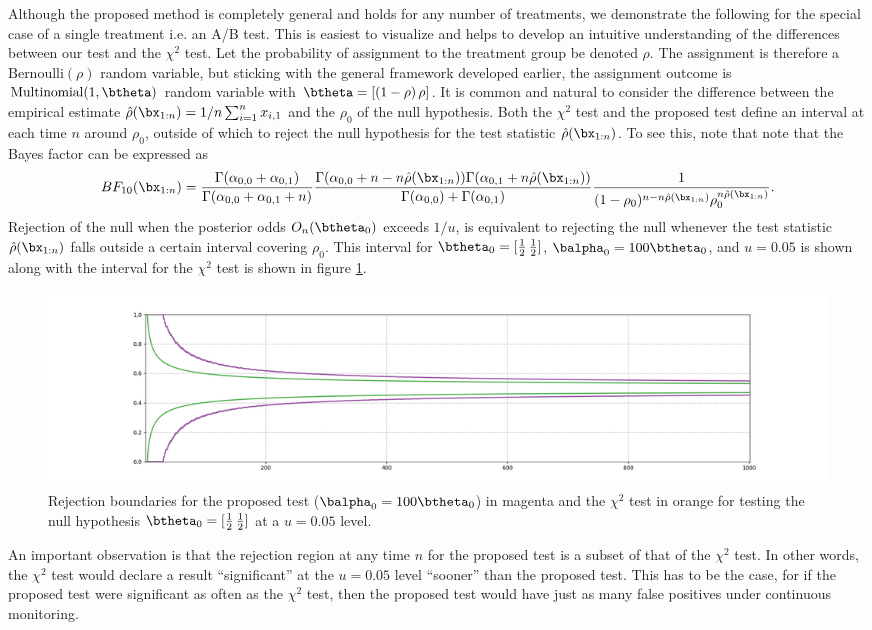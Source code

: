 \documentclass[11pt]{article}
\begin{document}
  Although the proposed method is completely general and holds for any number of treatments, we demonstrate the following for the special case of a single treatment i.e. an A/B test.
  This is easiest to visualize and helps to develop an intuitive understanding of the differences between our test and the $\chi^2$ test.
  Let the probability of assignment to the treatment group be denoted $\rho$.
The assignment is therefore a $\text{Bernoulli}(\rho)$ random variable, but sticking with the general framework developed earlier, the assignment outcome is $\text{Multinomial}(1,\btheta)$ random variable with $\btheta = [(1-\rho)\, \rho]$.
It is common and natural to consider the difference between the empirical estimate $\hat{\rho}(\bx_{1:n}) = 1/n \sum_{i=1}^{n} x_{i,1}$ and the $\rho_0$ of the null hypothesis.
Both the $\chi^2$ test and the proposed test define an interval at each time $n$ around $\rho_0$, outside of which to reject the null hypothesis for the test statistic $\hat{\rho}(\bx_{1:n})$.
To see this, note that note that the Bayes factor can be expressed as
\begin{equation}
  \label{eq:bayes_factor}
 BF_{10}(\bx_{1:n})  = \frac{\Gamma(\alpha_{0,0}+\alpha_{0,1})}{\Gamma(\alpha_{0,0}+\alpha_{0,1}+n)}\frac{\Gamma(\alpha_{0,0} + n-n\hat{\rho}(\bx_{1:n} ))\Gamma(\alpha_{0,1} + n\hat{\rho}(\bx_{1:n} )) }{\Gamma(\alpha_{0,0} )+\Gamma(\alpha_{0,1} )}\frac{1}{(1-\rho_{0})^{n-n\hat{\rho}(\bx_{1:n})}\rho_{0}^{n\hat{\rho}(\bx_{1:n})}}.
\end{equation}
  Rejection of the null when the posterior odds $O_n(\btheta_0)$ exceeds $1/u$, is equivalent to rejecting the null whenever the test statistic $\hat{\rho}(\bx_{1:n})$ falls outside a certain interval covering $\rho_0$.
This interval for $\btheta_0 = [\frac{1}{2}\, \frac{1}{2}]$, $\balpha_0 = 100\btheta_0 $, and $u=0.05$ is shown along with the interval for the $\chi^2$ test is shown in figure \ref{fig:critical}.
\begin{figure}[H]
  \centering
  \includegraphics[scale=0.35]{images/critical_regions.png}
  \caption{Rejection boundaries for the proposed test ($\balpha_0 = 100\btheta_0$) in magenta and the $\chi^2$ test in orange for testing the null hypothesis $\btheta_0 = [\frac{1}{2} \, \frac{1}{2}]$ at a $u=0.05$ level.
}
    \label{fig:critical}
  \end{figure}
  An important observation is that the rejection region at any time $n$ for the proposed test is a subset of that of the $\chi^2$ test.
In other words, the $\chi^2$ test would declare a result ``significant'' at the $u=0.05$ level ``sooner'' than the proposed test.
This has to be the case, for if the proposed test were significant as often as the $\chi^2$ test, then the proposed test would have just as many false positives under continuous monitoring.
  
\end{document}
